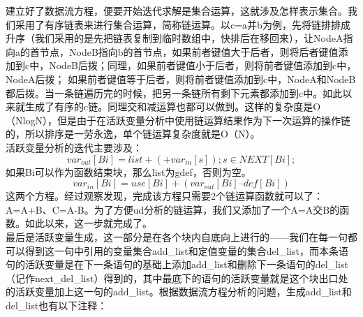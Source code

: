 \documentclass[12pt,a4paper,Flow]{report}
\begin{document}
\indent 建立好了数据流方程，便要开始迭代求解是集合运算，这就涉及怎样表示集合。我们采用了有序链表来进行集合运算，简称链运算。以c=a并b为例，先将链排排成升序（我们采用的是先把链表复制到临时数组中，快排后在移回来），让NodeA指向a的首节点，NodeB指向b的首节点，如果前者键值大于后者，则将后者键值添加到c中，NodeB后拨；同理，如果前者键值小于后者，则将前者键值添加到c中，NodeA后拨； 如果前者键值等于后者，则将前者键值添加到c中，NodeA和NodeB都后拨。当一条链遍历完的时候，把另一条链所有剩下元素都添加到c中。如此以来就生成了有序的c链。同理交和减运算也都可以做到。这样的复杂度是O（NlogN），但是由于在活跃变量分析中使用链运算结果作为下一次运算的操作链的，所以排序是一劳永逸，单个链运算复杂度就是O（N）。\\
\indent 活跃变量分析的迭代主要涉及：
\begin{displaymath}
	var_{out}[Bi] = list+(+var_{in}[s]);s\in NEXT[Bi];
\end{displaymath}
如果Bi可以作为函数结束块，那么list为gdef，否则为空。
\begin{displaymath}
	var_{in}[Bi] = use[Bi] + (var_{out}[Bi] – def[Bi])
\end{displaymath}
这两个方程。经过观察发现，完成该方程只需要2个链运算函数就可以了：A=A+B、C=A-B。为了方便ud分析的链运算，我们又添加了一个A=A交B的函数。如此以来，这一步就完成了。\\
最后是活跃变量生成，这一部分是在各个块内自底向上进行的——我们在每一句都可以得到这一句中引用的变量集合add\_list和定值变量的集合del\_list，而本条语句的活跃变量是在下一条语句的基础上添加add\_list和删除下一条语句的del\_list（记作next\_del\_list）得到的，其中最底下的语句的活跃变量就是这个块出口处的活跃变量加上这一句的add\_list。根据数据流方程分析的问题，生成add\_list和del\_list也有以下注释：
\end{document}

